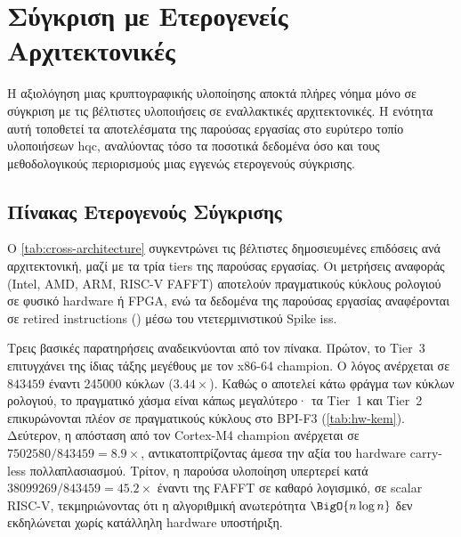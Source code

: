 \section{Σύγκριση με Ετερογενείς Αρχιτεκτονικές}
\label{sec:cross-architecture}

Η αξιολόγηση μιας κρυπτογραφικής υλοποίησης αποκτά πλήρες νόημα μόνο σε
σύγκριση με τις βέλτιστες υλοποιήσεις σε εναλλακτικές αρχιτεκτονικές.
Η ενότητα αυτή τοποθετεί τα αποτελέσματα της παρούσας εργασίας στο ευρύτερο
τοπίο υλοποιήσεων \gls{hqc}, αναλύοντας τόσο τα ποσοτικά δεδομένα όσο και τους
μεθοδολογικούς περιορισμούς μιας εγγενώς ετερογενούς σύγκρισης.

\subsection{Πίνακας Ετερογενούς Σύγκρισης}
\label{ssec:cross-arch-table}

Ο \cref{tab:cross-architecture} συγκεντρώνει τις βέλτιστες δημοσιευμένες
επιδόσεις  ανά αρχιτεκτονική, μαζί με τα τρία tiers της παρούσας
εργασίας. Οι μετρήσεις αναφοράς (Intel, AMD, ARM, RISC-V FAFFT) αποτελούν
πραγματικούς κύκλους ρολογιού σε φυσικό hardware ή FPGA, ενώ τα δεδομένα
της παρούσας εργασίας αναφέρονται σε retired instructions (\instret) μέσω
του ντετερμινιστικού Spike \gls{iss}.

\begin{table}[htbp]
  \centering
  \caption{Συγκριτική αξιολόγηση  \KEM ανά αρχιτεκτονική. Τα
    δεδομένα x86-64 (FFT+CRT) προέρχονται από \cite{Chen2026-TCHES-HQC-FFT}
    (AVX2 + PCLMULQDQ + GFNI, AMD EPYC 9754, full-KEM cache-key), τα
    SUPERCOP/Zen~4 από \cite{OptHQC2025}, τα Cortex-M4 από
    \cite{Jang2025-CortexM4-HQC}, και τα FAFFT RISC-V από
    \cite{ras-nist2025}. Η παρούσα εργασία χρησιμοποιεί \instret μέσω
    Spike ISS· ο \instret αποτελεί κάτω φράγμα των αντίστοιχων
    κύκλων ρολογιού.}%
  \label{tab:cross-architecture}
  \small
  
\end{table}

Τρεις βασικές παρατηρήσεις αναδεικνύονται από τον πίνακα. Πρώτον, το
Tier~3 επιτυγχάνει \instret της ίδιας τάξης
μεγέθους με τον x86-64 champion. Ο λόγος \Decaps ανέρχεται σε
$\num{843459}$ \instret έναντι \num{245000} κύκλων ($3.44\times$). Καθώς ο \instret αποτελεί κάτω φράγμα των κύκλων ρολογιού, το πραγματικό χάσμα είναι κάπως μεγαλύτερο· τα Tier~1 και Tier~2 επικυρώνονται πλέον σε πραγματικούς κύκλους στο BPI-F3 (\cref{tab:hw-kem}). Δεύτερον, η απόσταση από τον Cortex-M4 champion
ανέρχεται σε $\num{7502580} / \num{843459} = 8.9\times$, αντικατοπτρίζοντας
άμεσα την αξία του hardware carry-less πολλαπλασιασμού. Τρίτον, η παρούσα
υλοποίηση υπερτερεί κατά $\num{38099269} / \num{843459} = 45.2\times$ έναντι
της FAFFT σε καθαρό λογισμικό, σε scalar RISC-V, τεκμηριώνοντας ότι η αλγοριθμική
ανωτερότητα $\BigO{n \log n}$ δεν εκδηλώνεται χωρίς κατάλληλη hardware
υποστήριξη.

